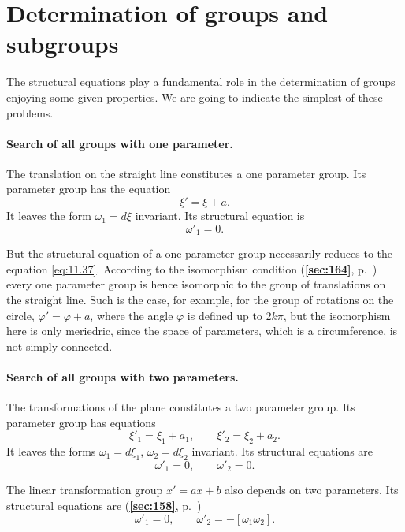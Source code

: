 \documentclass[leqno,11pt]{book}
\makeatletter
\numberwithin{equation}{chapter}
\theoremstyle{shape1}
\theoremstyle{shapesmall}
\let\old@phi\phi
\let\old@varphi\varphi
\let\phi\old@varphi
\let\varphi\old@phi
\newcommand{\fsref}[1]{{\rm\textsection\textbf{\ref{sec:#1}}}}
\makeatother
\begin{document}
\section{Determination of groups and subgroups}
\label{sec:determ-groups-subgr}

The structural equations play a fundamental role in the determination of groups enjoying some given properties. We are going to indicate the simplest of these problems.

\paragraph{Search of all groups with one parameter.}
\label{sec:167}
The translation on the straight line constitutes a one parameter group. Its parameter group has the equation
\[
\xi'=\xi+a.
\]
It leaves the form $\omega_{1}=d\xi$ invariant. Its structural equation is
\begin{equation}
  \label{eq:11.37}
  \omega'_{1}=0.
\end{equation}

But the structural equation of a one parameter group necessarily reduces to the equation \eqref{eq:11.37}. According to the isomorphism condition (\fsref{164}, p.~\pageref{sec:164}) every one parameter group is hence isomorphic to the group of translations on the straight line. Such is the case, for example, for the group of rotations on the circle, $\phi'=\phi+a$, where the angle $\phi$ is defined up to $2k\pi$, but the isomorphism here is only meriedric, since the space of parameters, which is a circumference, is not simply connected.

\paragraph{Search of all groups with two parameters.}
\label{sec:168}
The transformations of the plane constitutes a two parameter group. Its parameter group has equations
\begin{equation}
  \label{eq:11.38}
  \xi'_{1}=\xi_{1}+a_{1},\qquad\xi'_{2}=\xi_{2}+a_{2}.
\end{equation}
It leaves the forms $\omega_{1}=d\xi_{1}$, $\omega_{2}=d\xi_{2}$ invariant. Its structural equations are
\begin{equation}
  \label{eq:11.39}
  \omega'_{1}=0,\qquad\omega'_{2}=0.
\end{equation}

The linear transformation group $x'=ax+b$ also depends on two parameters. Its structural equations are (\fsref{158}, p.~\pageref{sec:158})
\begin{equation}
  \label{eq:11.40}
  \omega'_{1}=0,\qquad\omega'_{2}=-[\omega_{1}\omega_{2}].
\end{equation}
\end{document}
